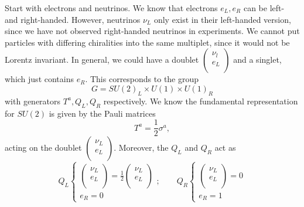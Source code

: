 Start with electrons and neutrinos.
We know that electrons $e_L, e_R$ can be left- and right-handed.
However, neutrinos $\nu_L$ only exist in their left-handed version, since we have not observed right-handed neutrinos in experiments.
We cannot put particles with differing chiralities into the same multiplet, since it would not be Lorentz invariant.
In general, we could have a doublet $
\begin{pmatrix}
\nu_l \\
e_L \\
\end{pmatrix} $ and a singlet, which just contains $e_R$.
This corresponds to the group
\begin{equation}
  \label{eq:ew-group}
  G = SU(2)_L \times U(1) \times U(1)_R
\end{equation}
with generators $T^a, Q_L, Q_R$ respectively.
We know the fundamental representation for $SU(2)$ is given by the Pauli matrices
\begin{equation}
  T^a = \frac{1}{2} \sigma^{a},
\end{equation}
acting on the doublet $
\begin{pmatrix}
\nu_L \\
e_L \\
\end{pmatrix} $. Moreover, the $Q_L$ and $Q_R$ act as
\begin{equation}
  Q_L \left\{ 
    \begin{gathered}
      \begin{pmatrix}
      \nu_L \\
      e_L \\
      \end{pmatrix}
      = \frac{1}{2}
      \begin{pmatrix}
      \nu_L \\
      e_L \\
      \end{pmatrix} \\
      e_R = 0
    \end{gathered}
  \right. ;
  \qquad
  Q_R \left\{ 
    \begin{gathered}
      \begin{pmatrix}
      \nu_L \\
      e_L \\
      \end{pmatrix}
      = 0 \\
      e_R = 1
    \end{gathered}
  \right.
\end{equation}
